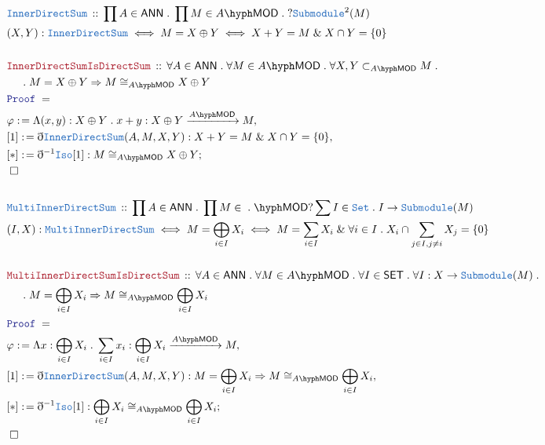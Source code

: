 \documentclass[12pt]{scrartcl}
\newcommand{\TYPE}[1]{\textcolor{NavyBlue}{\mathtt{#1}}}
\newcommand{\LOGIC}[1]{\textcolor{Blue}{\mathtt{#1}}}
\newcommand{\THM}[1]{\textcolor{Maroon}{\mathtt{#1}}}
\renewcommand{\.}{\; . \;}
\newcommand{\de}{: \kern 0.1pc =}
\newcommand{\Theorem}[2]{& \THM{#1} \, :: \, #2 \\ & \Proof = \\ }
\newcommand{\DeclareType}[2]{& \TYPE{#1} \, :: \, #2 \\}
\newcommand{\DefineNamedType}[4]{& #1 : \TYPE{#2} \iff #3 \iff #4 \\}
\newcommand{\NewLine}{\\ & \kern 1pc}
\newcommand{\Page}[1]{ \begin{align*} #1 \end{align*}   }
\newcommand{ \bd }{ \ByDef }
\renewcommand{\And}{\; \& \;}
\newcommand{\Set}{\TYPE{Set}}
\newcommand{\Say}[3]{& #1 \de #2 : #3, \\}
\newcommand{\Conclude}[3]{& #1 \de #2 : #3; \\}
\newcommand{\QED}{\; \square}
\newcommand{\EndProof}{& \QED \\}
\newcommand{\ByDef}{\eth}
\newcommand{\Proof}{\LOGIC{Proof} \; }
\newcommand{\Arrow}[1]{\xrightarrow{#1}}
\newcommand{\SET}{\mathsf{SET}}
\newcommand{\submod}[1]{\subset_{\LMOD{#1}}}
\newcommand{\LMOD}[1]{#1\hyph\mathsf{MOD}}
\newcommand{\ANN}{\mathsf{ANN}}
\begin{document}
\Page{
	\DeclareType{InnerDirectSum}{\prod A \in \ANN \. \prod M \in \LMOD{A} \. ?\TYPE{Submodule}^2(M)}
	\DefineNamedType{(X,Y)}{InnerDirectSum}{M = X \oplus Y}{X + Y = M \And X \cap Y = \{0\} }
	\\
	\Theorem{InnerDirectSumIsDirectSum}{
		\forall A \in \ANN \. \forall M \in \LMOD{A} \. \forall X,Y \submod{A} M \. \NewLine \. 
		 M = X \oplus Y \Rightarrow M \cong_{\LMOD{A}} X \oplus Y
	}
	\Say{\varphi}{\Lambda (x,y) : X \oplus Y \. x + y }{X \oplus Y \Arrow{\LMOD{A}} M}
	\Say{[1]}{ \bd \TYPE{InnerDirectSum}(A,M,X,Y) }{ X + Y = M \And X \cap Y = \{0\} }
	\Conclude{[*]}{\bd^{-1} \TYPE{Iso}[1] }{  M \cong_{\LMOD{A}} X \oplus Y}
	\EndProof
	\\
	\DeclareType{MultiInnerDirectSum}{
		\prod A \in \ANN \. \prod M \in \LMOD \. ? \sum I \in \Set \. I \to \TYPE{Submodule}(M) 
	}
	\DefineNamedType{(I,X)}{MultiInnerDirectSum}{M = \bigoplus_{i \in I} X_i}
	{M = \sum_{i \in I} X_i \And \forall i \in I \. X_i \cap \sum_{j \in I, j \neq i} X_j = \{0\}}
	\\
	\Theorem{MultiInnerDirectSumIsDirectSum}{
		\forall A \in \ANN \. \forall M \in \LMOD{A} \. \forall I \in \SET \. 
		\forall I : X \to \TYPE{Submodule}( M) \. \NewLine \. 
		 M = \bigoplus_{i \in I} X_i \Rightarrow M \cong_{\LMOD{A}} \bigoplus_{i \in I} X_i
	}
	\Say{\varphi}{\Lambda x : \bigoplus_{i \in I} X_i \. \sum_{i \in I} x_i }{\bigoplus_{i \in I} X_i  \Arrow{\LMOD{A}} M}
	\Say{[1]}{ \bd \TYPE{InnerDirectSum}(A,M,X,Y) }
	{ M = \bigoplus_{i \in I} X_i \Rightarrow M \cong_{\LMOD{A}} \bigoplus_{i \in I} X_i}
	\Conclude{[*]}{\bd^{-1} \TYPE{Iso}[1] }{  \bigoplus_{i \in I} X_i \cong_{\LMOD{A}} \bigoplus_{i \in I} X_i}
	\EndProof
}
\end{document}
